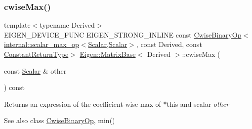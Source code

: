 \subsubsection{\texorpdfstring{cwiseMax()}{cwiseMax()}\hspace{0.1cm}{\footnotesize\ttfamily [2/2]}}
{\footnotesize\ttfamily template$<$typename Derived$>$ \\
E\+I\+G\+E\+N\+\_\+\+D\+E\+V\+I\+C\+E\+\_\+\+F\+U\+NC E\+I\+G\+E\+N\+\_\+\+S\+T\+R\+O\+N\+G\+\_\+\+I\+N\+L\+I\+NE const \mbox{\hyperlink{class_eigen_1_1_cwise_binary_op}{Cwise\+Binary\+Op}}$<$\mbox{\hyperlink{struct_eigen_1_1internal_1_1scalar__max__op}{internal\+::scalar\+\_\+max\+\_\+op}}$<$\mbox{\hyperlink{class_eigen_1_1_dense_base_a5feed465b3a8e60c47e73ecce83e39a2}{Scalar}},\mbox{\hyperlink{class_eigen_1_1_dense_base_a5feed465b3a8e60c47e73ecce83e39a2}{Scalar}}$>$, const Derived, const \mbox{\hyperlink{class_eigen_1_1_cwise_nullary_op}{Constant\+Return\+Type}}$>$ \mbox{\hyperlink{class_eigen_1_1_matrix_base}{Eigen\+::\+Matrix\+Base}}$<$ Derived $>$\+::cwise\+Max (\begin{DoxyParamCaption}\item[{const \mbox{\hyperlink{class_eigen_1_1_dense_base_a5feed465b3a8e60c47e73ecce83e39a2}{Scalar}} \&}]{other }\end{DoxyParamCaption}) const\hspace{0.3cm}{\ttfamily [inline]}}

\begin{DoxyReturn}{Returns}
an expression of the coefficient-\/wise max of $\ast$this and scalar {\itshape other} 
\end{DoxyReturn}
\begin{DoxySeeAlso}{See also}
class \mbox{\hyperlink{class_eigen_1_1_cwise_binary_op}{Cwise\+Binary\+Op}}, min() 
\end{DoxySeeAlso}
\mbox{\label{class_eigen_1_1_matrix_base_a5b789cbaea429d83bc180422d452afda}} 

